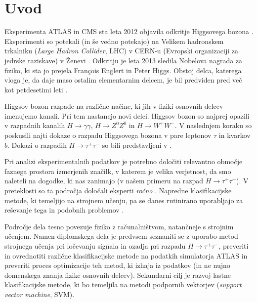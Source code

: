 \documentclass[11pt,a4paper,openany]{book}
\begin{document}





\chapter*{Uvod}

Eksperimenta ATLAS in CMS sta leta 2012 objavila odkritje Higgsovega bozona \cite{Aad20121,Chatrchyan201230}. Eksperimenti so potekali (in še vedno potekajo) na Velikem hadronskem trkalniku (\textit{Large Hadron Collider}, LHC) v CERN-u (Evropski organizaciji za jedrske raziskave) v Ženevi \cite{ChallengeDoc}. Odkritju je leta 2013 sledila Nobelova nagrada za fiziko, ki sta jo prejela François Englert in Peter Higgs. Obstoj delca, katerega vloga je, da daje maso ostalim elementarnim delcem, je bil predviden pred več kot petdesetimi leti \cite{1964PhL,1964PhRvL,1964PhysRevLett}. 

Higgsov bozon razpade na različne načine, ki jih v fiziki osnovnih delcev imenujemo kanali. Pri tem nastanejo novi delci. Higgsov bozon so najprej opazili v razpadnih kanalih $H \rightarrow \gamma\gamma$, $H \rightarrow Z^0Z^0$ in $H \rightarrow W^+W^-$. V naslednjem koraku so poskusili najti dokaze o razpadu Higgsovega bozona v pare leptonov $\tau$ in kvarkov $b$. Dokazi o razpadih $H \rightarrow \tau^+\tau^-$ so bili predstavljeni v \cite{atlas2013,atlas2015htautau}.

Pri analizi eksperimentalnih podatkov je potrebno določiti relevantno območje faznega prostora izmerjenih značilk, v katerem je velika verjetnost, da smo naleteli na dogodke, ki nas zanimajo (v našem primeru na razpad $H \rightarrow \tau^+\tau^-$). V preteklosti so ta področja določali eksperti \textit{ročno} \cite{Adam-Bourdarios14}. Napredne klasifikacijske metode, ki temeljijo na strojnem učenju, pa se danes rutinirano uporabljajo za reševanje tega in podobnih problemov \cite{atlas2013}.

Področje dela tesno povezuje fiziko z računalništvom, natančneje s strojnim učenjem. Namen diplomskega dela je predvsem seznaniti se z uporabo metod strojnega učenja pri ločevanju signala in ozadja pri razpadu $H \rightarrow \tau^+\tau^-$, preveriti in ovrednotiti različne klasifikacijske metode na podatkih simulatorja ATLAS in preveriti proces optimizacije teh metod, ki izhaja iz podatkov (in ne nujno domenskega znanja fizike osnovnih delcev). Sekundarni cilj je razvoj lastne klasifikacijske metode, ki bo temeljila na metodi podpornih vektorjev (\textit{support vector machine}, SVM).
\end{document}
